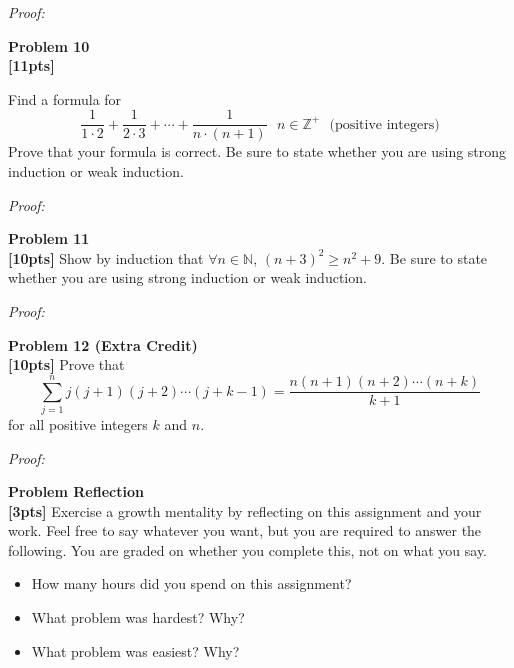\documentclass{article}
\newenvironment{problem}[2][Problem]
    { \begin{mdframed}[backgroundcolor=gray!20] \textbf{#1 #2} \\}
    {  \end{mdframed}}
\newenvironment{solution}
    {\textit{Proof:}}
    {}
\begin{document}
\begin{solution}
\end{solution}


\begin{problem}{10}
\textbf{[11pts]} \item Find a formula for
$$ \frac{1}{1\cdot 2} + \frac{1}{2\cdot 3} + \cdots + \frac{1}{n\cdot (n+1)}\ \ \ n\in\mathbb{Z}^+\ \ \ \text{(positive integers)}$$
Prove that your formula is correct. Be sure to state whether you are using strong induction or weak induction.
\end{problem}

\begin{solution}
\end{solution}

\begin{problem}{11}
\textbf{[10pts]} Show by induction that $\forall n\in\mathbb{N}$, $(n+3)^2\geq n^2+9$. Be sure to state whether you are using strong induction or weak induction.
\end{problem}

\begin{solution}
\end{solution}

\begin{problem}{12 (Extra Credit)}
\textbf{[10pts]} Prove that $$\sum_{j=1}^n j(j+1)(j+2)\cdots(j+k-1)=\frac{n(n+1)(n+2)\cdots(n+k)}{k+1}$$ for all positive integers $k$ and $n$.
\end{problem}

\begin{solution}
\end{solution}

\begin{problem}{Reflection}
\textbf{[3pts]} Exercise a growth mentality by reflecting on this assignment and your work. Feel free to say whatever you want, but you are required to answer the following. You are graded on whether you complete this, not on what you say.
\begin{itemize}
\item How many hours did you spend on this assignment?
\item What problem was hardest? Why?
\item What problem was easiest? Why?
\end{itemize}
\end{problem}
\end{document}
